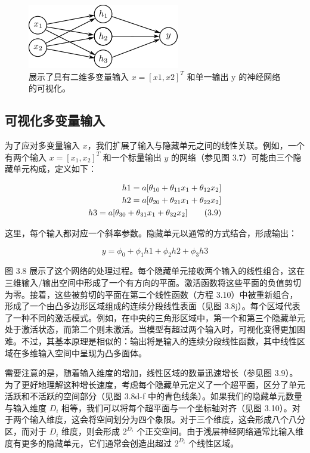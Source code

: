 \begin{figure}[ht!]
	\centering
	\includegraphics[width=0.7\linewidth]{png/chapter3/ShallowNetTwoInputs.png}
\caption{展示了具有二维多变量输入 $x = [x1, x2]^T$ 和单一输出 y 的神经网络的可视化。}
\end{figure}

\subsection{可视化多变量输入}

为了应对多变量输入 \(x\)，我们扩展了输入与隐藏单元之间的线性关联。例如，一个有两个输入 \(x = [x_1, x_2]^T\) 和一个标量输出 \(y\) 的网络（参见图 3.7）可能由三个隐藏单元构成，定义如下：


\begin{align}
	h1 = a[\theta_{10} + \theta_{11}x_1 + \theta_{12}x_2] \notag \\
	h2 = a[\theta_{20} + \theta_{21}x_1 + \theta_{22}x_2] \notag \\
	h3 = a[\theta_{30} + \theta_{31}x_1 + \theta_{32}x_2] \tag{3.9}
\end{align} 



这里，每个输入都对应一个斜率参数。隐藏单元以通常的方式结合，形成输出：

\[
y = \phi_0 + \phi_1h1 + \phi_2h2 + \phi_3h3 \tag{3.10}
\]


图 3.8 展示了这个网络的处理过程。每个隐藏单元接收两个输入的线性组合，这在三维输入/输出空间中形成了一个有方向的平面。激活函数将这些平面的负值剪切为零。接着，这些被剪切的平面在第二个线性函数（方程 3.10）中被重新组合，形成了一个由凸多边形区域组成的连续分段线性表面（见图 3.8j）。每个区域代表了一种不同的激活模式。例如，在中央的三角形区域中，第一个和第三个隐藏单元处于激活状态，而第二个则未激活。当模型有超过两个输入时，可视化变得更加困难。不过，其基本原理是相似的：输出将是输入的连续分段线性函数，其中线性区域在多维输入空间中呈现为凸多面体。

需要注意的是，随着输入维度的增加，线性区域的数量迅速增长（参见图 3.9）。为了更好地理解这种增长速度，考虑每个隐藏单元定义了一个超平面，区分了单元活跃和不活跃的空间部分（见图 3.8d-f 中的青色线条）。如果我们的隐藏单元数量与输入维度 \(D_i\) 相等，我们可以将每个超平面与一个坐标轴对齐（见图 3.10）。对于两个输入维度，这会将空间划分为四个象限。对于三个维度，这会形成八个八分区，而对于 \(D_i\) 维度，则会形成 \(2^{D_i}\) 个正交空间。由于浅层神经网络通常比输入维度有更多的隐藏单元，它们通常会创造出超过 \(2^{D_i}\) 个线性区域。

